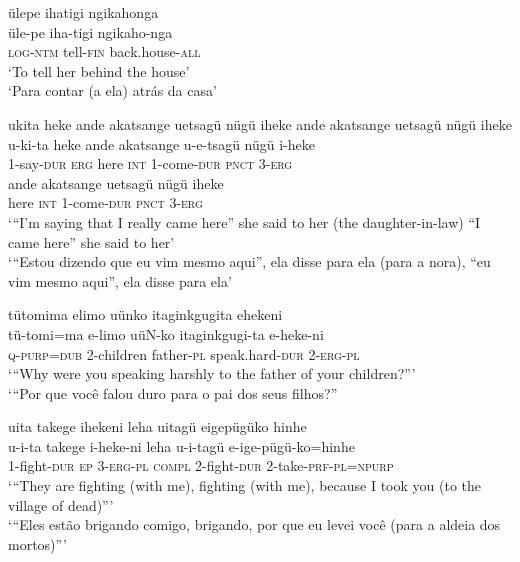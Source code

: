 \documentclass[output=paper,
modfonts,nonflat
]{langsci/langscibook}
\begin{document}
\ea ülepe ihatigi ngikahonga \\[.3em]
\gll üle-pe iha-tigi ngikaho-nga \\
\textsc{log-ntm} tell\textsc{-fin} back.house-\textsc{all} \\
\glt ‘To tell her behind the house’ \\
‘Para contar (a ela) atrás da casa’ \\
\z

\ea ukita heke ande akatsange uetsagü nügü iheke ande  akatsange uetsagü nügü iheke \\[.3em]
\gll u-ki-ta heke ande akatsange u-e-tsagü nügü i-heke  \\
1-say-\textsc{dur} \textsc{erg} here \textsc{int} 1-come-\textsc{dur} \textsc{pnct} 3-\textsc{erg} \\
\gll ande  akatsange uetsagü nügü iheke \\
here \textsc{int} 1-come-\textsc{dur} \textsc{pnct} 3-\textsc{erg} \\
\glt ‘“I’m saying that I really came here” she said to her (the daughter-in-law) “I came here” she said to her’ \\
‘“Estou dizendo que eu vim mesmo aqui”, ela disse para ela (para a nora), “eu vim mesmo aqui”, ela disse para ela’ \\
\z

\ea tütomima elimo uünko itaginkgugita ehekeni \\[.3em]
\gll tü-tomi=ma e-limo uüN-ko itaginkgugi-ta e-heke-ni \\
\textsc{q-purp=dub} 2-children father-\textsc{pl} speak.hard\textsc{-dur} \textsc{2-erg-pl} \\
\glt ‘“Why were you speaking harshly to the father of your children?”’  \\
‘“Por que você falou duro para o pai dos seus filhos?” \\
\z

\ea uita takege ihekeni leha uitagü eigepügüko hinhe \\[.3em]
\gll u-i-ta takege i-heke-ni leha u-i-tagü e-ige-pügü-ko=hinhe \\
1-fight-\textsc{dur} \textsc{ep} 3\textsc{-erg-pl} \textsc{compl} 2-fight-\textsc{dur} 2-take\textsc{-prf-pl=npurp} \\
\glt ‘“They are fighting (with me), fighting (with me), because I took you (to the village of dead)”’ \\
‘“Eles estão brigando comigo, brigando, por que eu levei você (para a aldeia dos mortos)”’ \\
\z
\end{document}
